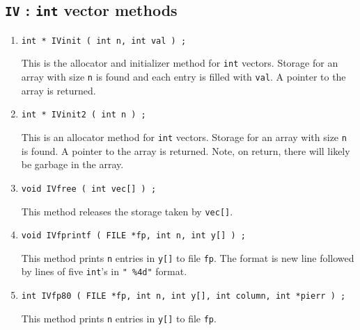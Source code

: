 \par
\subsection{{\tt IV} : {\tt int} vector methods}
\label{subsection:Utilities:proto:IV}
\par
\begin{enumerate}
\item
\begin{verbatim}
int * IVinit ( int n, int val ) ;
\end{verbatim}
This is the allocator and initializer method for {\tt int} vectors.
Storage for an array with size {\tt n} is found and each
entry is filled with {\tt val}.
A pointer to the array is returned.
\item
\begin{verbatim}
int * IVinit2 ( int n ) ;
\end{verbatim}
This is an allocator method for {\tt int} vectors.
Storage for an array with size {\tt n} is found.
A pointer to the array is returned.
Note, on return, there will likely be garbage in the array.
\item
\begin{verbatim}
void IVfree ( int vec[] ) ;
\end{verbatim}
This method releases the storage taken by {\tt vec[]}.
\item
\begin{verbatim}
void IVfprintf ( FILE *fp, int n, int y[] ) ;
\end{verbatim}
This method prints {\tt n} entries in {\tt y[]} to file {\tt fp}.
The format is new line followed by lines of five {\tt int}'s in
{\tt " \%4d"} format.
\item
\begin{verbatim}
int IVfp80 ( FILE *fp, int n, int y[], int column, int *pierr ) ;
\end{verbatim}
This method prints {\tt n} entries in {\tt y[]} to file {\tt fp}.

\end{enumerate}
